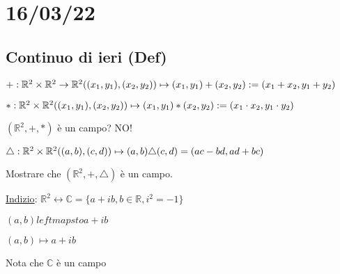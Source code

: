 \documentclass{article}
\newcommand{\ul}[1]{\underline{#1}}
\newcommand{\R}{\mathbb{R}}
\begin{document}
\section{16/03/22}
\subsection{Continuo di ieri (Def)}
\hspace*{1.3em}$+:\R^2\times\R^2\rightarrow\R^2\\
	((x_1,y_1),(x_2,y_2))\mapsto(x_1,y_1)+(x_2,y_2):=(x_1+x_2,y_1+y_2)$

$*:\R^2\times\R^2\\
	((x_1,y_1),(x_2,y_2))\mapsto(x_1,y_1)*(x_2,y_2):=(x_1\cdot x_2,y_1\cdot y_2)$

$(\R^2,+,*)$ è un campo? NO!

$\triangle:\R^2\times\R^2\\
	((a,b),(c,d))\mapsto(a,b)\triangle(c,d)=(ac-bd,ad+bc)$

Mostrare che $(\R^2,+,\triangle)$ è un campo.

\ul{Indizio}: $\R^2\leftrightarrow\mathbb{C}=\{a+ib,b\in\R,i^2=-1\}$

$(a,b)leftmapsto a+ib$

$(a,b)\mapsto a+ib$

Nota che $\mathbb{C}$ è un campo
\end{document}
